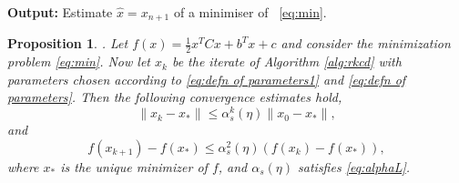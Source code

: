 \documentclass[10pt,a4paper]{article}
\newtheorem{proposition}[theorem]{Proposition}
\begin{document}
\begin{algorithm} [t]
\vspace{0.1cm}

\textbf{Output: } 
Estimate $\widehat{x}={x}_{n+1}$ of a minimiser of  ~\eqref{eq:min}. 

\label{alg:rkcd}
\end{algorithm}



 
 

 
 \begin{proposition} \label{prop:quad_RKC}
 {\cite{EVVZ21}.} {Let $f(x)=\frac12 x^TCx+b^Tx+c$ and consider the minimization problem \eqref{eq:min}}. Now let $x_{k}$ be the iterate of Algorithm \ref{alg:rkcd} with parameters chosen according to \eqref{eq:defn of parameters1} and
 \eqref{eq:defn of parameters}. 
Then the following {convergence estimates hold,}
 \begin{equation} \label{eq:ratte}
         \|x_{k}-x_*\|\leq \alpha^{k}_{s}(\eta)\|x_0-x_*\|,
     \end{equation}
     and
 \begin{equation}
         f(x_{k+1})-f(x_*)\leq \alpha^{2}_{s}(\eta)(f(x_k)-f(x_*)),
     \end{equation}
where  $x_{*}$ is the unique minimizer of $f$, and $\alpha_{s}(\eta)$ satisfies \eqref{eq:alphaL}. 

\end{proposition}
\end{document}
